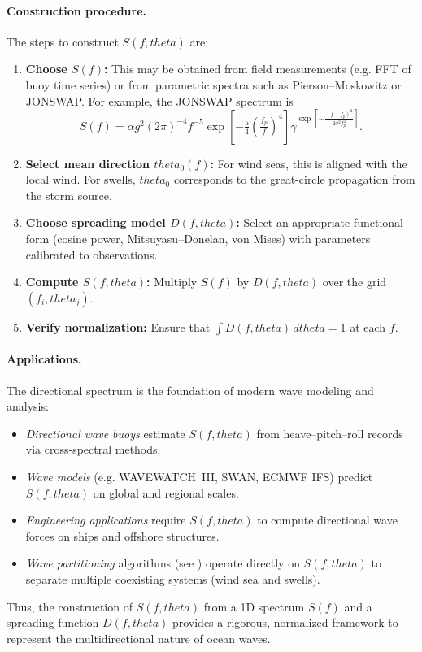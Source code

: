 \documentclass[journal,10pt,twocolumn]{IEEEtran}
\def\theta{theta}%
\begin{document}
    \paragraph{Construction procedure.}
    The steps to construct $S(f,\theta)$ are:
    \begin{enumerate}[leftmargin=1.5em]
        \item \textbf{Choose $S(f)$:} This may be obtained from field measurements (e.g. FFT of buoy time series) or from parametric spectra such as Pierson--Moskowitz or JONSWAP. For example, the JONSWAP spectrum is
        \begin{equation}
            S(f) = \alpha g^2 (2\pi)^{-4} f^{-5} \exp\!\left[-\tfrac{5}{4}\left(\tfrac{f_p}{f}\right)^4\right]
            \gamma^{\exp\!\left[-\tfrac{(f-f_p)^2}{2\sigma^2 f_p^2}\right]}.
        \end{equation}
        \item \textbf{Select mean direction $\theta_0(f)$:} For wind seas, this is aligned with the local wind. For swells, $\theta_0$ corresponds to the great-circle propagation from the storm source.
        \item \textbf{Choose spreading model $D(f,\theta)$:} Select an appropriate functional form (cosine power, Mitsuyasu--Donelan, von Mises) with parameters calibrated to observations.
        \item \textbf{Compute $S(f,\theta)$:} Multiply $S(f)$ by $D(f,\theta)$ over the grid $(f_i,\theta_j)$.
        \item \textbf{Verify normalization:} Ensure that $\int D(f,\theta)\,d\theta = 1$ at each $f$.
    \end{enumerate}

    \paragraph{Applications.}
    The directional spectrum is the foundation of modern wave modeling and analysis:
    \begin{itemize}[leftmargin=1.4em]
        \item \emph{Directional wave buoys} estimate $S(f,\theta)$ from heave--pitch--roll records via cross-spectral methods.
        \item \emph{Wave models} (e.g. WAVEWATCH~III, SWAN, ECMWF IFS) predict $S(f,\theta)$ on global and regional scales.
        \item \emph{Engineering applications} require $S(f,\theta)$ to compute directional wave forces on ships and offshore structures.
        \item \emph{Wave partitioning} algorithms (see ) operate directly on $S(f,\theta)$ to separate multiple coexisting systems (wind sea and swells).
    \end{itemize}
    Thus, the construction of $S(f,\theta)$ from a 1D spectrum $S(f)$ and a spreading function $D(f,\theta)$ provides a rigorous, normalized framework to represent the multidirectional nature of ocean waves.
\end{document}
